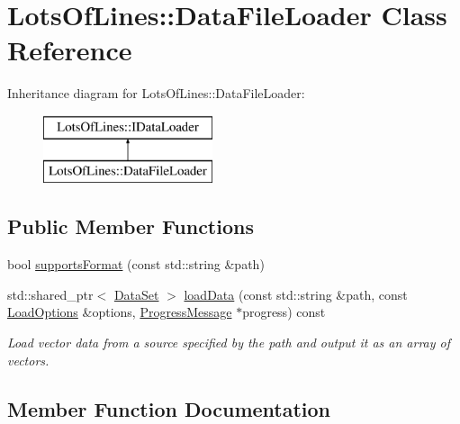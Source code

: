 \hypertarget{class_lots_of_lines_1_1_data_file_loader}{}\section{Lots\+Of\+Lines\+:\+:Data\+File\+Loader Class Reference}
\label{class_lots_of_lines_1_1_data_file_loader}
Inheritance diagram for Lots\+Of\+Lines\+:\+:Data\+File\+Loader\+:\begin{figure}[H]
\begin{center}
\leavevmode
\includegraphics[height=2.000000cm]{class_lots_of_lines_1_1_data_file_loader}
\end{center}
\end{figure}
\subsection*{Public Member Functions}
\begin{DoxyCompactItemize}
\item 
bool \hyperlink{class_lots_of_lines_1_1_data_file_loader_ac515d96c661865355080a999b8de1967}{supports\+Format} (const std\+::string \&path)
\item 
std\+::shared\+\_\+ptr$<$ \hyperlink{class_lots_of_lines_1_1_data_set}{Data\+Set} $>$ \hyperlink{class_lots_of_lines_1_1_data_file_loader_af7f8239a2828d607265cd3c52fcee87b}{load\+Data} (const std\+::string \&path, const \hyperlink{struct_lots_of_lines_1_1_load_options}{Load\+Options} \&options, \hyperlink{class_lots_of_lines_1_1_progress_message}{Progress\+Message} $\ast$progress) const 
\begin{DoxyCompactList}\small\item\em Load vector data from a source specified by the path and output it as an array of vectors. \end{DoxyCompactList}\end{DoxyCompactItemize}


\subsection{Member Function Documentation}
